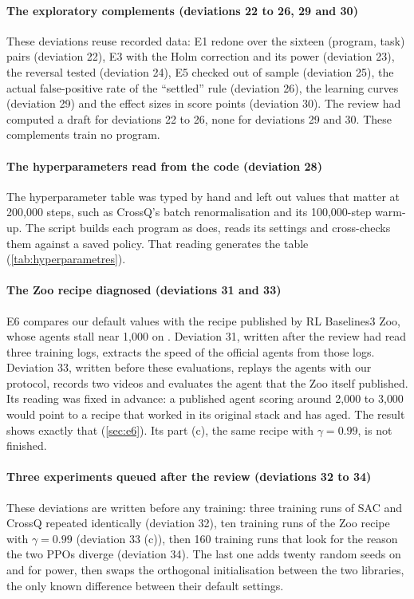 \paragraph{The exploratory complements (deviations 22 to 26, 29 and 30)} These deviations reuse
recorded data: E1 redone over the sixteen (program, task) pairs (deviation 22), E3 with the Holm
correction and its power (deviation 23), the  reversal tested (deviation 24), E5 checked
out of sample (deviation 25), the actual false-positive rate of the \enquote{settled} rule
(deviation 26), the learning curves (deviation 29) and the effect sizes in score points (deviation
30). The review had computed a draft for deviations 22 to 26, none for deviations 29 and 30. These
complements train no program.

\paragraph{The hyperparameters read from the code (deviation 28)} The hyperparameter table was typed
by hand and left out values that matter at 200{,}000 steps, such as CrossQ's batch renormalisation
and its 100{,}000-step warm-up. The script  builds each program as
 does, reads its settings and cross-checks them against a saved policy. That reading
generates the table (\cref{tab:hyperparametres}).

\paragraph{The Zoo recipe diagnosed (deviations 31 and 33)} E6 compares our default values with the
recipe published by RL Baselines3 Zoo, whose agents stall near 1{,}000 on .
Deviation 31, written after the review had read three training logs, extracts the speed of the
official agents from those logs. Deviation 33, written before these evaluations, replays the agents with our
protocol, records two videos and evaluates the agent that the Zoo itself published. Its reading was
fixed in advance: a published agent scoring around 2{,}000 to 3{,}000 would point to a recipe that
worked in its original stack and has aged. The result shows exactly that (\cref{sec:e6}). Its part
(c), the same recipe with $\gamma = 0.99$, is not finished.

\paragraph{Three experiments queued after the review (deviations 32 to 34)} These deviations are
written before any training: three training runs of SAC and CrossQ repeated identically (deviation 32), ten training
runs of the Zoo recipe with $\gamma = 0.99$ (deviation 33 (c)), then 160 training runs that look for
the reason the two PPOs diverge (deviation 34). The last one adds twenty random seeds on
 and  for power, then swaps the orthogonal initialisation between the two
libraries, the only known difference between their default settings.


